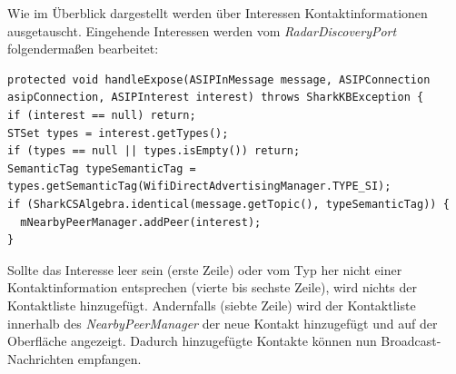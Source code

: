 Wie im Überblick dargestellt werden über Interessen Kontaktinformationen ausgetauscht. Eingehende Interessen werden vom \textit{RadarDiscoveryPort} folgendermaßen bearbeitet:
 \lstset{language=Java, caption=Verwertung von  Kontakt-Interessen (Auszug), label=DescriptiveLabel, numbers=left, numbersep=1em, breaklines=true, basicstyle=\small}
\begin{lstlisting}
protected void handleExpose(ASIPInMessage message, ASIPConnection asipConnection, ASIPInterest interest) throws SharkKBException {
if (interest == null) return;
STSet types = interest.getTypes();
if (types == null || types.isEmpty()) return;
SemanticTag typeSemanticTag = types.getSemanticTag(WifiDirectAdvertisingManager.TYPE_SI);
if (SharkCSAlgebra.identical(message.getTopic(), typeSemanticTag)) {
  mNearbyPeerManager.addPeer(interest);
}
\end{lstlisting}
Sollte das Interesse leer sein (erste Zeile) oder vom Typ her nicht einer Kontaktinformation entsprechen (vierte bis sechste Zeile), wird nichts der Kontaktliste hinzugefügt. Andernfalls (siebte Zeile) wird der Kontaktliste innerhalb des \textit{NearbyPeerManager} der neue Kontakt hinzugefügt und auf der Oberfläche angezeigt. Dadurch hinzugefügte Kontakte können nun Broadcast-Nachrichten empfangen.

